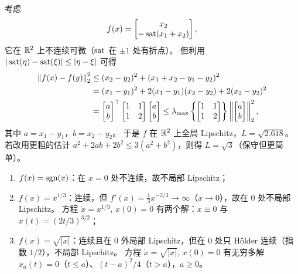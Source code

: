 \begin{example}\label{ex:lipschitz-sat}
  考虑
  \begin{equation}
    f(x)=\begin{bmatrix}
      x_2\\
      -\operatorname{sat}(x_1+x_2)
    \end{bmatrix},
  \end{equation}
  它在 $\mathbb{R}^2$ 上不连续可微（$\operatorname{sat}$ 在 $\pm1$ 处有折点）。
  但利用 $|\operatorname{sat}(\eta)-\operatorname{sat}(\xi)|\le|\eta-\xi|$ 可得
  \begin{align}
    \left\lVert f(x)-f(y)\right\rVert_2^2
    &\le (x_2-y_2)^2+(x_1+x_2-y_1-y_2)^2 \notag\\
    &=(x_1-y_1)^2+2(x_1-y_1)(x_2-y_2)+2(x_2-y_2)^2 \notag\\
    &=\begin{bmatrix}a\\b\end{bmatrix}^\top
      \begin{bmatrix}1&1\\1&2\end{bmatrix}
      \begin{bmatrix}a\\b\end{bmatrix}
    \le \lambda_{\max}\left\{\begin{bmatrix}1&1\\1&2\end{bmatrix}\right\}\left\lVert\begin{bmatrix}a\\b\end{bmatrix}\right\rVert_2^2,
  \end{align}
  其中 $a=x_1-y_1$，$b=x_2-y_2$。
  于是 $f$ 在 $\mathbb{R}^2$ 上全局 Lipschitz，$L=\sqrt{2.618}$。
  若改用更粗的估计 $a^2+2ab+2b^2\le 3(a^2+b^2)$，则得 $L=\sqrt{3}$（保守但更简单）。
  \cite[Example 3.2]{khalilNonlinearSystems}
\end{example}

\begin{example}\label{ex:not-lipschitz}
  \begin{enumerate}
    \item $f(x)=\operatorname{sgn}(x)$：在 $x=0$ 处不连续，故不局部 Lipschitz；
    \item $f(x)=x^{1/3}$：连续，但 $f'(x)=\tfrac13 x^{-2/3}\to\infty$（$x\to0$），故在 $0$ 处不局部 Lipschitz。
          方程 $\dot x=x^{1/3},\,x(0)=0$ 有两个解：$x\equiv0$ 与 $x(t)=(2t/3)^{3/2}$；
    \item $f(x)=\sqrt{|x|}$：连续且在 $0$ 外局部 Lipschitz，但在 $0$ 处只 Hölder 连续（指数 $1/2$），不局部 Lipschitz。
          方程 $\dot x=\sqrt{|x|},\,x(0)=0$ 有无穷多解 $x_a(t)=0$（$t\le a$）、$(t-a)^2/4$（$t>a$），$a\ge0$。
  \end{enumerate}
\end{example}

